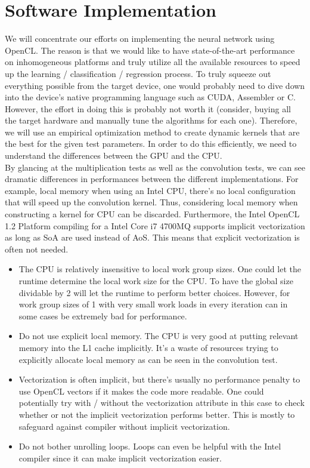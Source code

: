 \documentclass[a4paper,10pt]{article}
\theoremstyle{definition}
\begin{document}
\section{Software Implementation}
We will concentrate our efforts on implementing the neural network using OpenCL. The reason is that we would like to have state-of-the-art performance on inhomogeneous platforms and truly utilize all the available resources to speed up the learning / classification / regression process. To truly squeeze out everything possible from the target device, one would probably need to dive down into the device's native programming language such as CUDA, Assembler or C. However, the effort in doing this is probably not worth it (consider, buying all the target hardware and manually tune the algorithms for each one). Therefore, we will use an empirical optimization method to create dynamic kernels that are the best for the given test parameters. In order to do this efficiently, we need to understand the differences between the GPU and the CPU.\\

By glancing at the multiplication tests as well as the convolution tests, we can see dramatic differences in performances between the different implementations. For example, local memory when using an Intel CPU, there's no local configuration that will speed up the convolution kernel. Thus, considering local memory when constructing a kernel for CPU can be discarded. Furthermore, the Intel OpenCL 1.2 Platform compiling for a Intel Core i7 4700MQ supports implicit vectorization as long as SoA are used instead of AoS. This means that explicit vectorization is often not needed.

\begin{itemize}
	\item  The CPU is relatively insensitive to local work group sizes. One could let the runtime determine the local work size for the CPU. To have the global size dividable by 2 will let the runtime to perform better choices. However, for work group sizes of 1 with very small work loads in every iteration can in some cases be extremely bad for performance. 
	\item Do not use explicit local memory. The CPU is very good at putting relevant memory into the L1 cache implicitly. It's a waste of resources trying to explicitly allocate local memory as can be seen in the convolution test.
	\item Vectorization is often implicit, but there's usually no performance penalty to use OpenCL vectors if it makes the code more readable. One could potentially try with / without the vectorization attribute in this case to check whether or not the implicit vectorization performs better. This is mostly to safeguard against compiler without implicit vectorization.
	\item Do not bother unrolling loops. Loops can even be helpful with the Intel compiler since it can make implicit vectorization easier. 
\end{itemize}
\end{document}
